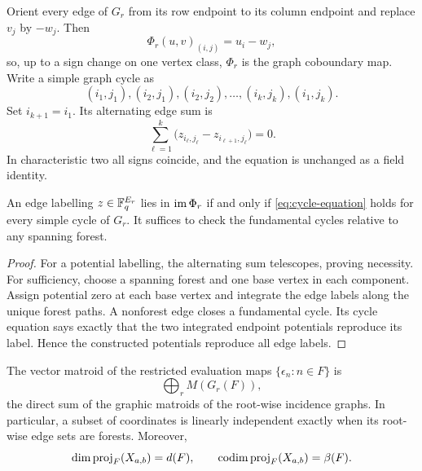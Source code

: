 Orient every edge of $G_r$ from its row endpoint to its column endpoint and
replace $v_j$ by $-w_j$.  Then
\[
 \Phi_r(u,v)_{(i,j)}=u_i-w_j,
\]
so, up to a sign change on one vertex class, $\Phi_r$ is the graph
coboundary map.  Write a simple graph cycle as
\begin{equation}\label{eq:cycle-form}
 (i_1,j_1),(i_2,j_1),(i_2,j_2),\ldots,
 (i_k,j_k),(i_1,j_k).
\end{equation}
Set $i_{k+1}=i_1$.  Its alternating edge sum is
\begin{equation}\label{eq:cycle-equation}
 \sum_{\ell=1}^{k}
 \bigl(z_{i_\ell,j_\ell}-z_{i_{\ell+1},j_\ell}\bigr)=0.
\end{equation}
In characteristic two all signs coincide, and the equation is unchanged as a
field identity.

\begin{proposition}\label{prop:cycle-complete}
An edge labelling $z\in\mathbb F_q^{E_r}$ lies in $\operatorname{im}\Phi_r$ if and only if
\eqref{eq:cycle-equation} holds for every simple cycle of $G_r$.  It suffices to
check the fundamental cycles relative to any spanning forest.
\end{proposition}

\begin{proof}
For a potential labelling, the alternating sum telescopes, proving necessity.
For sufficiency, choose a spanning forest and one base vertex in each
component.  Assign potential zero at each base vertex and integrate the edge
labels along the unique forest paths.  A nonforest edge closes a fundamental
cycle.  Its cycle equation says exactly that the two integrated endpoint
potentials reproduce its label.  Hence the constructed potentials reproduce
all edge labels.
\end{proof}

\begin{corollary}\label{cor:graphic-matroid}
The vector matroid of the restricted evaluation maps
$\{\epsilon_n:n\in F\}$ is
\begin{equation}\label{eq:matroid-direct-sum}
 \bigoplus_r M(G_r(F)),
\end{equation}
the direct sum of the graphic matroids of the root-wise incidence graphs.
In particular, a subset of coordinates is linearly independent exactly when
its root-wise edge sets are forests.  Moreover,
\begin{equation}\label{eq:cycle-codimension}
 \dim\operatorname{proj}_F(X_{a,b})=d(F),
 \qquad
 \operatorname{codim}\operatorname{proj}_F(X_{a,b})=\beta(F).
\end{equation}
\end{corollary}

